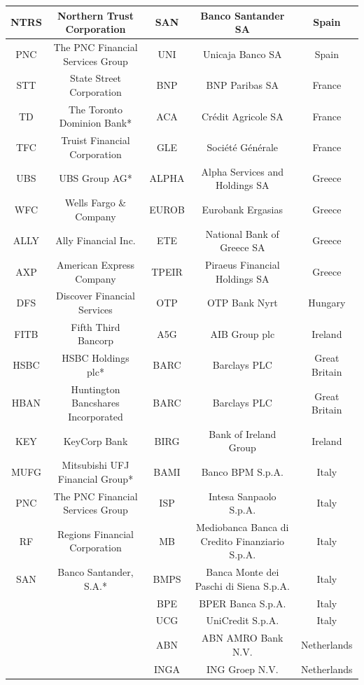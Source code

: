 \documentclass[12pt]{article}
\begin{document}
\begin{table}[!htbp]
\begin{center}
{\begin{tabular}{c|c||c |c|c}
			\hline
			NTRS & Northern Trust Corporation & SAN & Banco Santander SA & Spain \\
			\hline
			PNC & The PNC Financial Services Group & UNI & Unicaja Banco SA & Spain \\
			\hline
			STT & State Street Corporation & BNP &  BNP Paribas SA & France \\
			\hline
			TD & The Toronto Dominion Bank* & ACA & Crédit Agricole SA & France \\
			\hline
			TFC & Truist Financial Corporation & GLE & Société Générale & France \\
			\hline
			UBS & UBS Group AG* & ALPHA & Alpha Services and Holdings SA & Greece \\
			\hline
			WFC & Wells Fargo \& Company & EUROB & Eurobank Ergasias & Greece \\
			\hline
			ALLY & Ally Financial Inc. & ETE & National Bank of Greece SA & Greece \\
			\hline
			AXP & American Express Company & TPEIR & Piraeus Financial Holdings SA & Greece \\
			\hline
			DFS & Discover Financial Services & OTP & OTP Bank Nyrt & Hungary \\
			\hline
			FITB & Fifth Third Bancorp & A5G & AIB Group plc & Ireland \\
			\hline
			HSBC & HSBC Holdings plc* & BARC & Barclays PLC & Great Britain \\
			\hline
			HBAN & Huntington Bancshares Incorporated & BARC & Barclays PLC & Great Britain \\
			\hline
			KEY & KeyCorp Bank & BIRG & Bank of Ireland Group & Ireland \\
			\hline
			MUFG & Mitsubishi UFJ Financial Group* & BAMI & Banco BPM S.p.A. & Italy \\
			\hline 
			PNC & The PNC Financial Services Group & ISP & Intesa Sanpaolo S.p.A. & Italy \\
			\hline
			RF & Regions Financial Corporation & MB & Mediobanca Banca di Credito Finanziario S.p.A. & Italy \\
			\hline
			SAN & Banco Santander, S.A.* & BMPS & Banca Monte dei Paschi di Siena S.p.A. & Italy \\
			\hline
			& & BPE & BPER Banca S.p.A. & Italy \\
			\hline
			& & UCG & UniCredit S.p.A. & Italy \\
			\hline
			& & ABN & ABN AMRO Bank N.V. & Netherlands \\
			\hline
			& & INGA & ING Groep N.V. & Netherlands \\

\end{tabular}}
\end{center}
\end{table}
\end{document}
